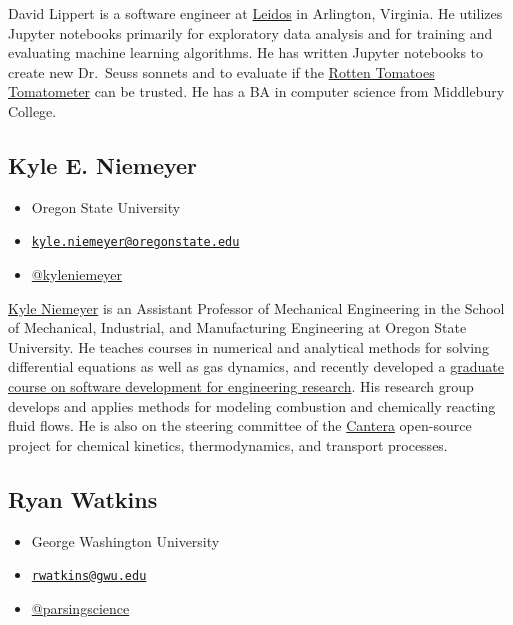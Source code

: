 \documentclass[]{book}
\providecommand{\tightlist}{%
  \setlength{\itemsep}{0pt}\setlength{\parskip}{0pt}}
\begin{document}
David Lippert is a software engineer at \href{https://www.leidos.com}{Leidos} in Arlington,
Virginia. He utilizes Jupyter notebooks primarily for exploratory data analysis and
for training and evaluating machine learning algorithms. He has written Jupyter
notebooks to create new Dr.~Seuss sonnets and to evaluate if the
\href{https://www.rottentomatoes.com/about}{Rotten Tomatoes Tomatometer} can be trusted.
He has a BA in computer science from Middlebury College.

\hypertarget{kyle-e.-niemeyer}{%
\subsection*{Kyle E. Niemeyer}\label{kyle-e.-niemeyer}}

\begin{itemize}
\tightlist
\item
  Oregon State University
\item
  \href{mailto:kyle.niemeyer@oregonstate.edu}{\nolinkurl{kyle.niemeyer@oregonstate.edu}}
\item
  \href{https://twitter.com/kyleniemeyer}{@kyleniemeyer}
\end{itemize}

\href{https://niemeyer-research-group.github.io/}{Kyle Niemeyer} is an Assistant Professor
of Mechanical Engineering in the School of Mechanical, Industrial, and Manufacturing
Engineering at Oregon State University. He teaches courses in numerical and analytical
methods for solving differential equations as well as gas dynamics, and recently developed a
\href{https://softwaredevengresearch.github.io/syllabus/}{graduate course on software development for engineering research}.
His research group develops and applies methods for modeling combustion and chemically
reacting fluid flows. He is also on the steering committee of the
\href{https://cantera.org/}{Cantera} open-source project for chemical kinetics, thermodynamics,
and transport processes.

\hypertarget{ryan-watkins}{%
\subsection*{Ryan Watkins}\label{ryan-watkins}}

\begin{itemize}
\tightlist
\item
  George Washington University
\item
  \href{mailto:rwatkins@gwu.edu}{\nolinkurl{rwatkins@gwu.edu}}
\item
  \href{https://twitter.com/parsingscience}{@parsingscience}
\end{itemize}
\end{document}
